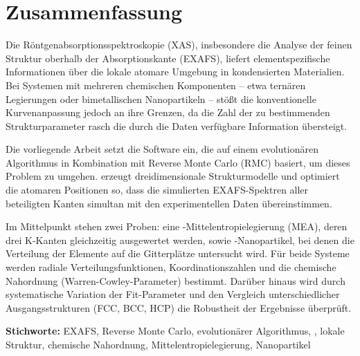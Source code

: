 \chapter*{Zusammenfassung}

Die Röntgenabsorptionsspektroskopie (XAS), insbesondere die Analyse der
feinen Struktur oberhalb der Absorptionskante (EXAFS), liefert elementspezifische
Informationen über die lokale atomare Umgebung in kondensierten Materialien.
Bei Systemen mit mehreren chemischen Komponenten -- etwa ternären Legierungen
oder bimetallischen Nanopartikeln -- stößt die konventionelle Kurvenanpassung
jedoch an ihre Grenzen, da die Zahl der zu bestimmenden Strukturparameter
rasch die durch die Daten verfügbare Information übersteigt.

Die vorliegende Arbeit setzt die Software \evax{} ein, die auf einem
evolutionären Algorithmus in Kombination mit Reverse Monte Carlo (RMC)
basiert, um dieses Problem zu umgehen.
\evax{} erzeugt dreidimensionale Strukturmodelle und optimiert die atomaren
Positionen so, dass die simulierten EXAFS-Spektren aller beteiligten Kanten
simultan mit den experimentellen Daten übereinstimmen.

Im Mittelpunkt stehen zwei Proben:
eine -Mittelentropielegierung (MEA), deren drei K-Kanten
gleichzeitig ausgewertet werden, sowie -Nanopartikel, bei denen
die Verteilung der Elemente auf die Gitterplätze untersucht wird.
Für beide Systeme werden radiale Verteilungsfunktionen, Koordinationszahlen
und die chemische Nahordnung (Warren-Cowley-Parameter) bestimmt.
Darüber hinaus wird durch systematische Variation der Fit-Parameter und
den Vergleich unterschiedlicher Ausgangsstrukturen (FCC, BCC, HCP)
die Robustheit der Ergebnisse überprüft.

\vspace{0.5\baselineskip}

\textbf{Stichworte:}
EXAFS, Reverse Monte Carlo, evolutionärer Algorithmus, \evax{},
lokale Struktur, chemische Nahordnung, Mittelentropielegierung, Nanopartikel

